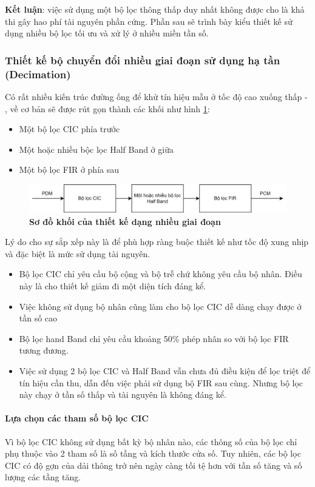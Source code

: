 \textbf{Kết luận}: việc sử dụng một bộ lọc thông thấp duy nhất không được cho là khả thi gây hao phí tài nguyên phần cứng. Phần sau sẽ trình bày kiểu thiết kế sử dụng nhiều bộ lọc tối ưu và xử lý ở nhiều miền tần số.

\subsubsection{Thiết kế bộ chuyển đổi nhiều giai đoạn sử dụng hạ tần (Decimation)}
Có rất nhiều kiến trúc đường ống để khử tín hiệu mẫu ở tốc độ cao xuống thấp \cite{pipelie1} - \cite{pipelie2}, về cơ bản sẽ được rút gọn thành các khối như hình \ref{pipeline_top}:
\begin{itemize}
    \item Một bộ lọc CIC phía trước
    \item Một hoặc nhiều bộc lọc Half Band ở giữa
    \item Một bộ lọc FIR ở phía sau
\end{itemize}

\begin{figure}[H]
    \centering
    \includegraphics[width=15cm]{Images/Chuong3/pipeline_top.png}
    \caption[Sơ đồ khối của thiết kế dạng nhiều giai đoạn]{\bfseries \fontsize{12pt}{0pt}\selectfont Sơ đồ khối của thiết kế dạng nhiều giai đoạn}
    \label{pipeline_top}
\end{figure}
Lý do cho sự sắp xếp này là để phù hợp ràng buộc thiết kế như tốc độ xung nhịp và đặc biệt là mức sử dụng tài nguyên.
\begin{itemize}
    \item Bộ lọc CIC chỉ yêu cầu bộ cộng và bộ trễ chứ không yêu cầu bộ nhân. Điều này là cho thiết kế giảm đi một diện tích đáng kể.
    \item Việc không sử dụng bộ nhân cũng làm cho bộ lọc CIC dễ dàng chạy được ở tần số cao
    \item Bộ lọc hand Band chỉ yêu cầu khoảng 50\% phép nhân so với bộ lọc FIR tương đương.
    \item Việc sử dụng 2 bộ lọc CIC và Half Band vẫn chưa đủ điều kiện để lọc triệt để tín hiệu cần thu, dẫn đến việc phải sử dụng bộ FIR sau cùng. Nhưng bộ lọc này chạy ở tần số thấp và tài nguyên là không đáng kể.
\end{itemize}
\paragraph{Lựa chọn các tham số bộ lọc CIC}
Vì bộ lọc CIC không sử dụng bất kỳ bộ nhân nào, các thông số của bộ lọc chỉ phụ thuộc vào 2 tham số là số tầng và kích thước cửa số. Tuy nhiên, các bộ lọc CIC có độ gợn của dải thông trở nên ngày càng tồi tệ hơn với tần số tăng và số lượng các tầng tăng.

